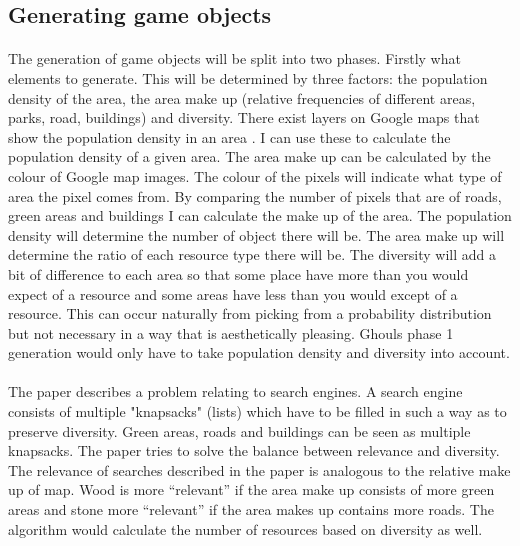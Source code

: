 \documentclass{article}
\begin{document}
	\subsection{Generating game objects}
		
		\paragraph{}The generation of game objects will be split into two phases. Firstly what elements to generate. This will be determined by three factors: the population density of the area, the area make up (relative frequencies of different areas, parks, road, buildings) and diversity. There exist layers on Google maps that show the population density in an area \cite{GOOGLEMAPSPOPDEN}. I can use these to calculate the population density of a given area. The area make up can be calculated by the colour of Google map images. The colour of the pixels will indicate what type of area the pixel comes from. By comparing the number of pixels that are of roads, green areas and buildings I can calculate the make up of the area. The population density will determine the number of object there will be. The area make up will determine the ratio of each resource type there will be. The diversity will add a bit of difference to each area so that some place have more than you would expect of a resource and some areas have less than you would except of a resource. This can occur naturally from picking from a probability distribution but not necessary in a way that is aesthetically pleasing. Ghouls phase 1 generation would only have to take population density and diversity into account.
		
		\paragraph{}The paper \cite{Multiple-Knapsacks} describes a problem relating to search engines. A search engine consists of multiple "knapsacks" (lists) which have to be filled in such a way as to preserve diversity. Green areas, roads and buildings can be seen as multiple knapsacks. The paper tries to solve the balance between relevance and diversity. The relevance of searches described in the paper is analogous to the relative make up of map. Wood is more “relevant” if the area make up consists of more green areas and stone more “relevant” if the area makes up contains more roads. The algorithm would calculate the number of resources based on diversity as well. 
		
\end{document}
